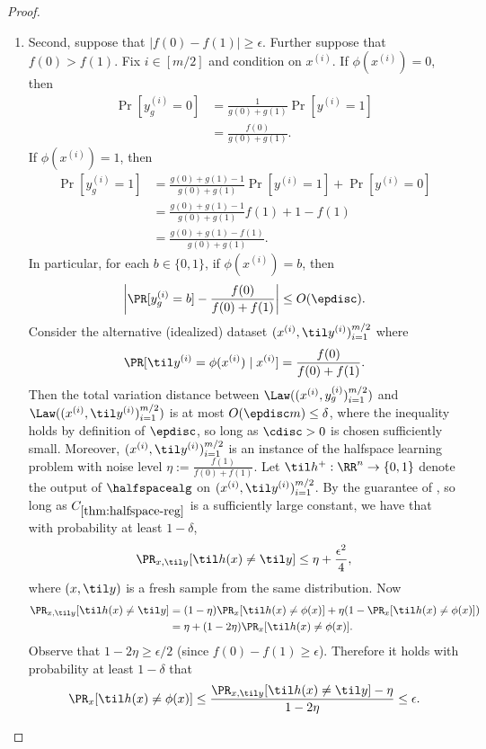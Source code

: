 \begin{proof}
\begin{enumerate}
\item Second, suppose that $|f(0) - f(1)| \geq \epsilon$. Further suppose that $f(0) > f(1)$. Fix $i \in [m/2]$ and condition on $x^{(i)}$. If $\phi(x^{(i)}) = 0$, then 
\begin{align*}
\Pr[y_g^{(i)} = 0]
&= \frac{1}{g(0) + g(1)}\Pr[y^{(i)} = 1] \\ 
&= \frac{f(0)}{g(0) + g(1)}.
\end{align*}
If $\phi(x^{(i)}) = 1$, then
\begin{align*}
\Pr[y_g^{(i)} = 1]
&= \frac{g(0)+g(1)-1}{g(0)+g(1)}\Pr[y^{(i)}=1] + \Pr[y^{(i)}=0] \\ 
&= \frac{g(0)+g(1)-1}{g(0)+g(1)}f(1) + 1 - f(1) \\ 
&= \frac{g(0) + g(1) - f(1)}{g(0) + g(1)}.
\end{align*}
In particular, for each $b \in \{0,1\}$, if $\phi(x^{(i)}) = b$, then
\[\left|\Pr[y_g^{(i)}=b] - \frac{f(0)}{f(0) + f(1)}\right| \leq O(\epdisc).\]
Consider the alternative (idealized) dataset $(x^{(i)}, \til y^{(i)})_{i=1}^{m/2}$ where 
\[\Pr[\til y^{(i)} = \phi(x^{(i)}) \mid{} x^{(i)}] = \frac{f(0)}{f(0) + f(1)}.\]
Then the total variation distance between $\Law((x^{(i)},y_g^{(i)})_{i=1}^{m/2})$ and $\Law((x^{(i)},\til y^{(i)})_{i=1}^{m/2})$ is at most $O(\epdisc m) \leq \delta$, where the inequality holds by definition of $\epdisc$, so long as $\cdisc>0$ is chosen sufficiently small. Moreover, $(x^{(i)},\til y^{(i)})_{i=1}^{m/2}$ is an instance of the halfspace learning problem with noise level $\eta := \frac{f(1)}{f(0) + f(1)}$.  Let $\til h^+: \RR^n \to \{0,1\}$ denote the output of $\halfspacealg$ on $(x^{(i)}, \til y^{(i)})_{i=1}^{m/2}$. By the guarantee of \cite[Theorem 1.8]{diakonikolas2023strongly}, so long as $C_{\ref{thm:halfspace-reg}}$ is a sufficiently large constant, we have that with probability at least $1-\delta$,
\[\Pr_{x,\til y}[\til h(x) \neq \til y] \leq \eta + \frac{\epsilon^2}{4},\]
where $(x,\til y)$ is a fresh sample from the same distribution. Now
\begin{align*}
\Pr_{x,\til y}[\til h(x) \neq \til y]
&= (1-\eta) \Pr_x[\til h(x) \neq \phi(x)] + \eta (1 - \Pr_x[\til h(x) \neq \phi(x)]) \\ 
&= \eta + (1-2\eta) \Pr_x[\til h(x) \neq \phi(x)].
\end{align*}
Observe that $1 - 2\eta \geq \epsilon/2$ (since $f(0) - f(1) \geq \epsilon$). Therefore it holds with probability at least $1-\delta$ that
\[\Pr_x[\til h(x) \neq \phi(x)] \leq \frac{\Pr_{x,\til y}[\til h(x) \neq \til y] - \eta}{1-2\eta} \leq \epsilon.\]

\end{enumerate}
\end{proof}
